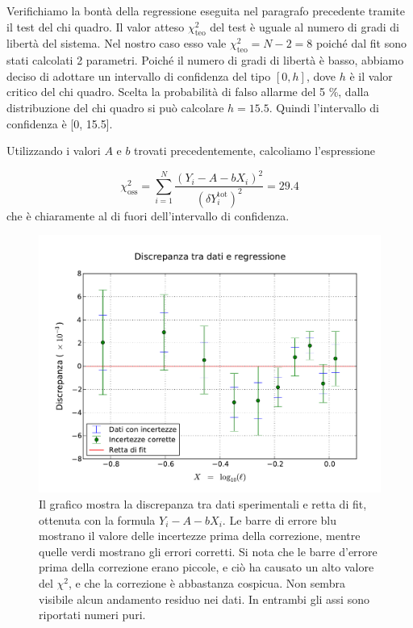 Verifichiamo la bontà della regressione eseguita nel paragrafo precedente tramite il test del chi quadro.
Il valor atteso $\chi^2_{\text{teo}}$ del test è uguale al numero di gradi di libertà del sistema. Nel nostro caso
esso vale $\chi^2_{\text{teo}} = N - 2 = 8$ poiché dal fit sono stati calcolati 2 parametri. Poiché
il numero di gradi di libertà è basso, abbiamo deciso di adottare un intervallo di confidenza del tipo $[0, h]$,
dove $h$ è il valor critico del chi quadro. Scelta la probabilità di falso allarme del 5 \%, dalla distribuzione
del chi quadro si può calcolare $h = 15.5$. Quindi l'intervallo di confidenza è [0, 15.5]. 

Utilizzando i valori $A$ e $b$ trovati precedentemente, calcoliamo l'espressione

\begin{equation}
    \chi^2_{\text{oss}} = \sum_{i=1}^N \frac{(Y_i - A - bX_i)^2}{(\delta Y_i^{\text{tot}})^2} = 29.4
\end{equation}
%
che è chiaramente al di fuori dell'intervallo di confidenza.

\begin{figure}
    \centering
    \includegraphics[width=115mm]{immagini/l_discrepanza.pdf}
    \caption{Il grafico mostra la discrepanza tra dati sperimentali e retta di fit, ottenuta con la formula $Y_i - A - bX_i$.
        Le barre di errore blu mostrano il valore delle incertezze prima della correzione, mentre quelle verdi mostrano gli errori
        corretti. Si nota che le barre d'errore prima della correzione erano piccole, e ciò ha causato un alto
        valore del $\chi^2$, e che la correzione è abbastanza cospicua. Non sembra visibile alcun andamento residuo nei dati.
        In entrambi gli assi sono riportati numeri puri.}
    \label{fig:l_discrepanza}
\end{figure}

